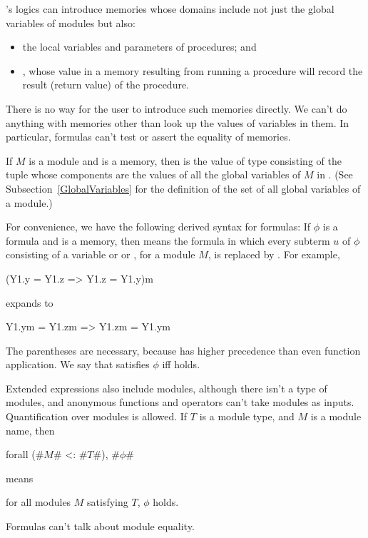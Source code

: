 \EasyCrypt's logics can introduce memories whose domains include not
just the global variables of modules but also:
\begin{itemize}
\item the local variables and parameters of
  procedures; and

\item {}, whose value in a memory resulting from running a
  procedure will record the result (return value) of the procedure.
\end{itemize}
There is no way for the user to introduce such memories directly.  We
can't do anything with memories other than look up the values of
variables in them. In particular, formulas can't test or assert the
equality of memories.

If $M$ is a module and  is a memory, then  is the value of type  consisting of the
tuple whose components are the values of all the global variables of
$M$ in .  (See Subsection~\ref{GlobalVariables} for the
definition of the set of all global variables of a module.)

For convenience, we have the following derived syntax for formulas: If
$\phi$ is a formula and  is a memory, then 
means the formula in which every subterm $u$ of $\phi$ consisting of a
variable or  or , for a module
$M$, is replaced by .  For example,
\begin{easycrypt}{}{}
(Y1.y = Y1.z => Y1.z = Y1.y){m}
\end{easycrypt}
expands to
\begin{easycrypt}{}{}
Y1.y{m} = Y1.z{m} => Y1.z{m} = Y1.y{m}
\end{easycrypt}
The parentheses are necessary, because  has
higher precedence than even function application.
We say that  satisfies $\phi$ iff  holds.

Extended expressions also include modules, although there isn't a type
of modules, and anonymous functions and operators can't take modules
as inputs.  Quantification over modules is allowed. If $T$ is a module
type, and $M$ is a module name, then
\begin{easycrypt}{}{}
forall (#$M$# <: #$T$#), #$\phi$#
\end{easycrypt}
means
\begin{center}
 for all modules $M$ satisfying $T$, $\phi$ holds.
\end{center}
Formulas can't talk about module equality.

